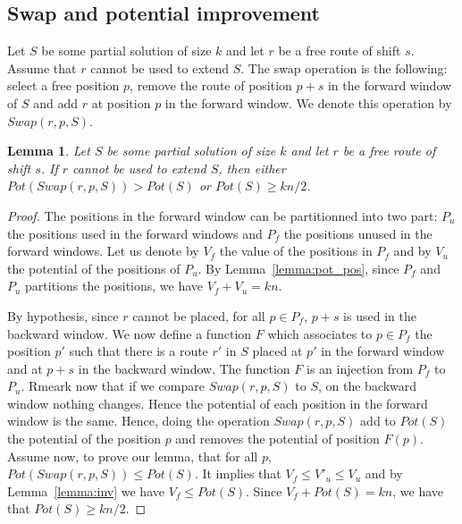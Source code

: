 \documentclass[10pt, conference, letterpaper]{IEEEtran}
\newtheorem{lemma}[theorem]{Lemma}
\begin{document}
\subsection{Swap and potential improvement}


Let $S$ be some partial solution of size $k$ and let $r$ be a free route of shift $s$. 
Assume that $r$ cannot be used to extend $S$. The swap operation is the following: 
select a free position $p$, remove the route of position $p+s$ in the forward window 
of $S$ and add $r$ at position $p$ in the forward window. We denote this operation by $Swap(r,p,S)$.

\begin{lemma}
Let $S$ be some partial solution of size $k$ and let $r$ be a free route of shift $s$. 
If $r$ cannot be used to extend $S$, then either $Pot(Swap(r,p,S)) > Pot(S)$ or 
$Pot(S) \geq kn/2$.
\end{lemma}

\begin{proof}\label{swap}
The positions in the forward window can be partitionned into two part: $P_{u}$ the positions used in the forward windows and $P_{f}$ the positions unused in the forward windows.
Let us denote by $V_f$ the value of the positions in $P_f$ and by $V_u$ the potential of the positions of $P_u$. By Lemma~\ref{lemma:pot_pos}, since $P_f$ and $P_u$ partitions the positions, we have $V_f + V_u = kn$.

By hypothesis, since $r$ cannot be placed, for all $p \in P_{f}$, $p+s$ is used in the backward window. We now define a function $F$ which associates to $p \in P_{f}$ the position $p'$ such that there is a route $r'$ in $S$ placed at $p'$ in the forward window and at $p+s$ in the backward window. The function $F$ is an injection from $P_{f}$ to $P_u$. Rmeark now that if we compare $Swap(r,p,S)$ to $S$, on the backward window nothing changes. 
Hence the potential of each position in the forward window is the same. Hence, doing the operation $Swap(r,p,S)$ add to $Pot(S)$ the potential of the position $p$ and removes the potential of position $F(p)$. 
Assume now, to prove our lemma, that for all $p$, $Pot(Swap(r,p,S)) \leq Pot(S)$. It implies that 
$V_f \leq V'_u \leq V_u$ and by Lemma~\ref{lemma:inv} we have $V_f \leq Pot(S)$.
Since $V_f + Pot(S) = kn$, we have that $Pot(S) \geq kn/2$.
\end{proof}
\end{document}
